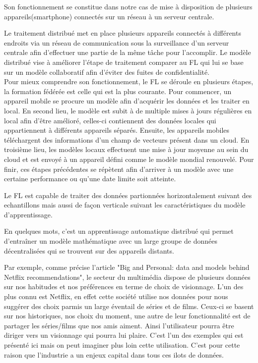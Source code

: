 \documentclass[12pt,a4paper]{report}
\begin{document}
Son fonctionnement se constitue dans notre cas de mise à disposition de plusieurs appareils(smartphone) connectés sur un réseau à un serveur centrale.




Le traitement distribué met en place plusieurs appareils connectés à différents endroits via un réseau de communication sous la surveillance d'un serveur centrale afin d'effectuer une partie de la même tâche pour l'accomplir. Le modèle distribué vise à améliorer l'étape de traitement comparer au FL qui lui se base sur un modèle collaboratif afin d'éviter des fuites de confidentialité.\\

Pour mieux comprendre son fonctionnement, le FL se déroule en plusieurs étapes, la formation fédérée est celle qui est la plus courante. Pour commencer, un appareil mobile se procure un modèle afin d'acquérir les données et les traiter en local. En second lieu, le modèle est subit à de multiple mises à jours régulières en local afin d'être amélioré, celles-ci contiennent des données locales qui appartiennent à différents appareils séparés. Ensuite, les appareils mobiles téléchargent des informations d'un champ de vecteurs présent dans un cloud. En troisième lieu, les modèles locaux effectuent une mise à jour moyenne au sein du cloud et est envoyé à un appareil défini comme le modèle mondial renouvelé. Pour finir, ces étapes précédentes se répètent afin d'arriver à un modèle avec une certaine performance ou qu'une date limite soit atteinte.

Le FL est capable de traiter des données partionnées horizontalement suivant des echantillons mais aussi de façon verticale suivant les caractéristiques du modèle d'apprentissage.

En quelques mots, c'est un apprentissage automatique distribué qui permet d'entraîner un modèle mathématique avec un large groupe de données décentralisées qui se trouvent sur des appareils distants.

Par exemple, comme précise l'article "Big and Personal: data and models behind Netflix recommendations", le secteur du multimédia dispose de plusieurs données sur nos habitudes et nos préférences en terme de choix de visionnage. L'un des plus connu est Netflix, en effet cette société utilise nos données pour nous suggérer des choix parmis un large éventail de séries et de films. Ceux-ci se basent sur nos historiques, nos choix du moment, une autre de leur fonctionnalité est de partager les séries/films que nos amis aiment. Ainsi l'utilisateur pourra être diriger vers un visionnage qui pourra lui plaire. C'est l'un des exemples qui est présenté ici mais on peut imaginer plus loin cette utilisation. C'est pour cette raison que l'industrie a un enjeux capital dans tous ces ilots de données.\\
\end{document}
